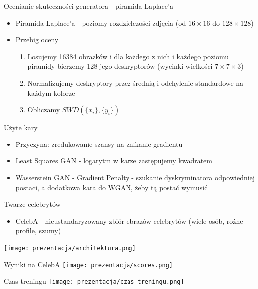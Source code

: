 \documentclass[11pt]{beamer}
\begin{document}
\begin{frame}{Ocenianie skuteczności generatora - piramida Laplace'a}
\begin{itemize}
    \item Piramida Laplace'a - poziomy rozdzielczości zdjęcia (od $16\times16$ do $128\times128$)
    \item Przebig oceny 
    \begin{enumerate}
        \item Losujemy 16384 obrazków i dla każdego z nich i każdego poziomu piramidy bierzemy 128 jego deskryptorów (wycinki wielkości $7\times7\times3$)
        \item Normalizujemy deskryptory przez średnią i odchylenie standardowe na każdym kolorze
        \item Obliczamy $SWD(\{x_i\},\{y_i\})$
    \end{enumerate}
\end{itemize}
\end{frame}

\begin{frame}{Użyte kary}
\begin{itemize}
    \item Przyczyna: zredukowanie szansy na znikanie gradientu
    \item Least Squares GAN - logarytm w karze zastępujemy kwadratem
    \item Wasserstein GAN - Gradient Penalty - szukanie dyskryminatora odpowiedniej postaci, a dodatkowa kara do WGAN, żeby tą postać wymusić
\end{itemize}
\end{frame}

\begin{frame}{Twarze celebrytów}
\begin{itemize}
    \item CelebA - nieustandaryzowany zbiór obrazów celebrytów (wiele osób, rożne profile, szumy)
\end{itemize}
\minipage{\textwidth}
\texttt{[image: prezentacja/architektura.png]}
\endminipage
\end{frame}

\begin{frame}{Wyniki na CelebA}
\minipage{\textwidth}
\texttt{[image: prezentacja/scores.png]}
\endminipage
\end{frame}

\begin{frame}{Czas treningu}
\minipage{\textwidth}
\texttt{[image: prezentacja/czas\_treningu.png]}
\endminipage
\end{frame}
\end{document}
